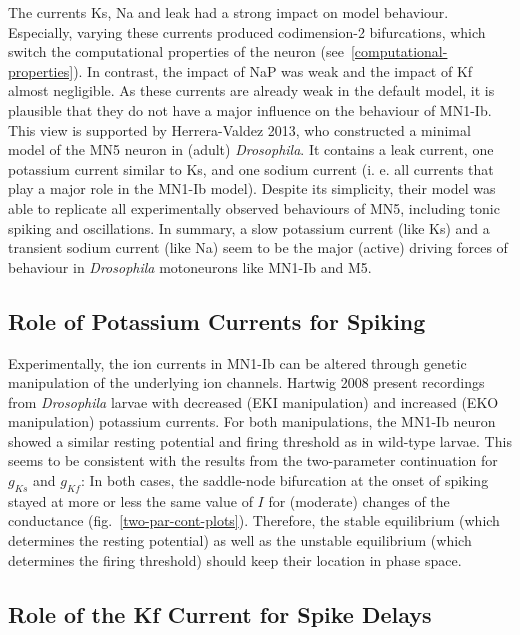 \documentclass[12pt,a4paper,]{report}
\begin{document}
The currents Ks, Na and leak had a strong impact on model behaviour.
Especially, varying these currents produced codimension-2 bifurcations,
which switch the computational properties of the neuron
(see~\ref{computational-properties}). In contrast, the impact of NaP was
weak and the impact of Kf almost negligible. As these currents are
already weak in the default model, it is plausible that they do not have
a major influence on the behaviour of MN1-Ib. This view is supported by
Herrera-Valdez 2013, who constructed a minimal model of the MN5 neuron
in (adult) \emph{Drosophila}. It contains a leak current, one potassium
current similar to Ks, and one sodium current (i. e. all currents that
play a major role in the MN1-Ib model). Despite its simplicity, their
model was able to replicate all experimentally observed behaviours of
MN5, including tonic spiking and oscillations. In summary, a slow
potassium current (like Ks) and a transient sodium current (like Na)
seem to be the major (active) driving forces of behaviour in
\emph{Drosophila} motoneurons like MN1-Ib and M5.

\subsection{Role of Potassium Currents for
Spiking}\label{role-of-potassium-currents-for-spiking}

Experimentally, the ion currents in MN1-Ib can be altered through
genetic manipulation of the underlying ion channels. Hartwig 2008
present recordings from \emph{Drosophila} larvae with decreased (EKI
manipulation) and increased (EKO manipulation) potassium currents. For
both manipulations, the MN1-Ib neuron showed a similar resting potential
and firing threshold as in wild-type larvae. This seems to be consistent
with the results from the two-parameter continuation for $g_{Ks}$ and
$g_{Kf}$: In both cases, the saddle-node bifurcation at the onset of
spiking stayed at more or less the same value of $I$ for (moderate)
changes of the conductance (fig.~\ref{two-par-cont-plots}). Therefore,
the stable equilibrium (which determines the resting potential) as well
as the unstable equilibrium (which determines the firing threshold)
should keep their location in phase space.

\subsection{Role of the Kf Current for Spike
Delays}\label{role-of-the-kf-current-for-spike-delays}
\end{document}
